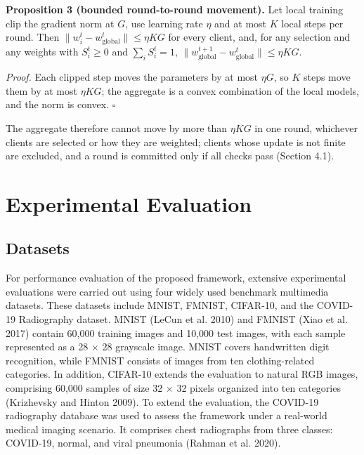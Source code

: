 \documentclass[pdflatex,sn-mathphys-num,oneside]{sn-jnl}%
\theoremstyle{thmstyleone}%
\theoremstyle{thmstyletwo}%
\theoremstyle{thmstylethree}%
\begin{document}
\textbf{Proposition 3 (bounded round-to-round movement).} Let local training clip the gradient norm at $G$, use learning rate $\eta$ and at most $K$ local steps per round. Then $\|w_i^t-w_{\text{global}}^t\|\le\eta KG$ for every client, and, for any selection and any weights with $S_i^t\ge 0$ and $\sum_i S_i^t=1$, $\|w_{\text{global}}^{t+1}-w_{\text{global}}^t\|\le\eta KG$.

\textit{Proof.} Each clipped step moves the parameters by at most $\eta G$, so $K$ steps move them by at most $\eta KG$; the aggregate is a convex combination of the local models, and the norm is convex. \hfill$\square$

The aggregate therefore cannot move by more than $\eta KG$ in one round, whichever clients are selected or how they are weighted; clients whose update is not finite are excluded, and a round is committed only if all checks pass (Section 4.1).

\section{Experimental Evaluation}\label{sec5}

\subsection{Datasets}

For performance evaluation of the proposed framework, extensive experimental evaluations were carried out using four widely used benchmark multimedia datasets. These datasets include MNIST, FMNIST, CIFAR-10, and the COVID-19 Radiography dataset. MNIST (LeCun et al. 2010) and FMNIST (Xiao et al. 2017) contain 60,000 training images and 10,000 test images, with each sample represented as a 28 \ensuremath{\times} 28 grayscale image. MNIST covers handwritten digit recognition, while FMNIST consists of images from ten clothing-related categories. In addition, CIFAR-10 extends the evaluation to natural RGB images, comprising 60,000 samples of size 32 \ensuremath{\times} 32 pixels organized into ten categories (Krizhevsky and Hinton 2009). To extend the evaluation, the COVID-19 radiography database was used to assess the framework under a real-world medical imaging scenario. It comprises chest radiographs from three classes: COVID-19, normal, and viral pneumonia (Rahman et al. 2020).  
\end{document}
